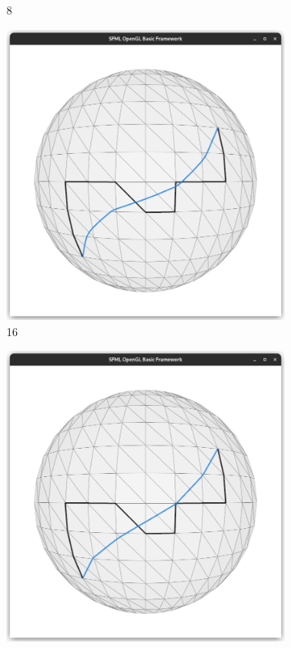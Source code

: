 \documentclass{stdlocal}
\begin{document}
\begin{figure}
\begin{subfigure}[b]{0.24\linewidth}
    \caption{8}
  \end{subfigure}
  \begin{subfigure}[b]{0.24\linewidth}
    \centering
    \includegraphics[width=\linewidth,trim={25px 20 25 50},clip]{images/sphere-geodesic-1-iteration-16.png}
    \caption{16}
  \end{subfigure}
  \begin{subfigure}[b]{0.24\linewidth}
    \centering
    \includegraphics[width=\linewidth,trim={25px 20 25 50},clip]{images/sphere-geodesic-1-iteration-32.png}

\end{subfigure}
\end{figure}
\end{document}
